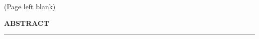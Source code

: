 
\pagebreak[1] \clearpage
\thispagestyle{empty}%
\begin{center}
	(Page left blank)
\end{center}

\pagebreak[1] \vfill \clearpage \thispagestyle{empty} \quad
\thispagestyle{empty}
\begin{center}
	\textbf{\large ABSTRACT} \\
	\noindent\rule{10cm}{0.8pt}
\end{center}

